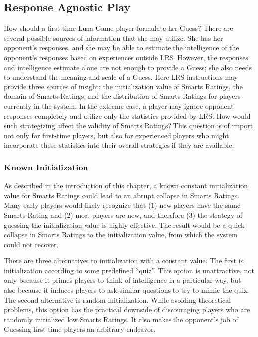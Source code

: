 \subsection{Response Agnostic Play}

How should a first-time Luna Game player formulate her Guess? There are several possible sources of information that she may utilize. She has her opponent's responses, and she may be able to estimate the intelligence of the opponent's responses based on experiences outside LRS. However, the responses and intelligence estimate alone are not enough to provide a Guess; she also needs to understand the meaning and scale of a Guess. Here LRS instructions may provide three sources of insight: the initialization value of Smarts Ratings, the domain of Smarts Ratings, and the distribution of Smarts Ratings for players currently in the system. In the extreme case, a player may ignore opponent responses completely and utilize only the statistics provided by LRS. How would such strategizing affect the validity of Smarts Ratings? This question is of import not only for first-time players, but also for experienced players who might incorporate these statistics into their overall strategies if they are available.

\subsubsection{Known Initialization}

As described in the introduction of this chapter, a known constant initialization value for Smarts Ratings could lead to an abrupt collapse in Smarts Ratings. Many early players would likely recognize that ($1$) new players have the same Smarts Rating and ($2$) most players are new, and therefore ($3$) the strategy of guessing the initialization value is highly effective. The result would be a quick collapse in Smarts Ratings to the initialization value, from which the system could not recover. 

There are three alternatives to initialization with a constant value. The first is initialization according to some predefined ``quiz''. This option is unattractive, not only because it primes players to think of intelligence in a particular way, but also because it induces players to ask similar questions to try to mimic the quiz. The second alternative is random initialization. While avoiding theoretical problems, this option has the practical downside of discouraging players who are randomly initialized low Smarts Ratings. It also makes the opponent's job of Guessing first time players an arbitrary endeavor.

